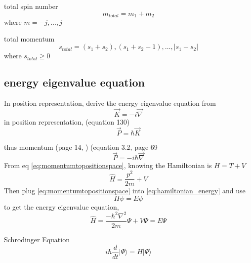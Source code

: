\documentclass[12pt]{article}  %
\begin{document}
total spin number
\begin{equation}
m_{total} = m_1 + m_2
\end{equation}
where $m = -j,\ldots,j$

total momentum
\begin{equation}
s_{total} = (s_1 + s_2),(s_1 + s_2 -1),\ldots,| s_1 - s_2 |
\end{equation}
where $s_{total} \geq 0$

\subsection{energy eigenvalue equation}

In position representation, derive the energy eigenvalue equation from
\begin{equation}
  \vec{K} = -i \vec{\nabla}
	\label{eq:wavenumberinpositionspace}
\end{equation}
in position representation, (equation 130)
\begin{equation}
  \vec{P} = \hbar \vec{K}
	\label{eq:momentumwavenumber}
\end{equation}

thus momentum (page 14, \cite{ParrisQM}) (equation 3.2, page 69 \cite{LiboffQM}
\begin{equation}
  \vec{P} = - i \hbar \vec{\nabla}
	\label{eq:momentumtopositionspace}
\end{equation}
From eq \ref{eq:momentumtopositionspace}, knowing the Hamiltonian is $H = T+V$
\begin{equation}
  \hat{H} = \frac{p^2}{2 m} + V
	\label{eq:hamiltonian_energy}
\end{equation}
Then plug \ref{eq:momentumtopositionspace} into \ref{eq:hamiltonian_energy} and use 
\begin{equation}
H \psi = E \psi
\end{equation}
 to get the energy eigenvalue equation,
\begin{equation}
  \hat{H} = \frac{-\hbar ^2 \nabla ^2}{2 m}\Psi + V\Psi = E \Psi
	\label{eq:energy_eigenvalue}
\end{equation}

Schrodinger Equation
\begin{equation}
  i \hbar \frac{d}{dt}|\Psi \rangle = H |\Psi \rangle
	\label{eq:schrodinger_equ}
\end{equation}
\end{document}
